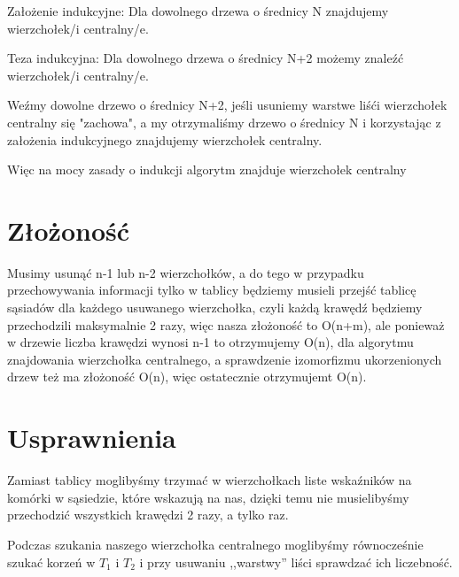 \documentclass[12pt,a4paper]{article}
\begin{document}
Założenie indukcyjne: Dla dowolnego drzewa o średnicy N znajdujemy wierzchołek/i centralny/e.

Teza indukcyjna: Dla dowolnego drzewa o średnicy N+2 możemy znaleźć wierzchołek/i centralny/e.

Weźmy dowolne drzewo o średnicy N+2, jeśli usuniemy warstwe liśći wierzchołek centralny się "zachowa", a my otrzymaliśmy drzewo o średnicy N i korzystając z założenia indukcyjnego znajdujemy wierzchołek centralny.

Więc na mocy zasady o indukcji algorytm znajduje wierzchołek centralny

\section{Złożoność}
Musimy usunąć n-1 lub n-2 wierzchołków, a do tego w przypadku przechowywania informacji tylko w tablicy będziemy musieli przejść tablicę sąsiadów dla każdego usuwanego wierzchołka, czyli każdą krawędź będziemy przechodzili maksymalnie 2 razy, więc nasza złożoność to O(n+m), ale ponieważ w drzewie liczba krawędzi wynosi n-1 to otrzymujemy O(n), dla algorytmu znajdowania wierzchołka centralnego, a sprawdzenie izomorfizmu ukorzenionych drzew też ma złożoność O(n), więc ostatecznie otrzymujemt O(n).

\section{Usprawnienia}
Zamiast tablicy moglibyśmy trzymać w wierzchołkach liste wskaźników na komórki w sąsiedzie, które wskazują na nas, dzięki temu nie musielibyśmy przechodzić wszystkich krawędzi 2 razy, a tylko raz.

Podczas szukania naszego wierzchołka centralnego moglibyśmy równocześnie szukać korzeń w $T_1$ i $T_2$ i przy usuwaniu ,,warstwy'' liści sprawdzać ich liczebność.
\end{document}
